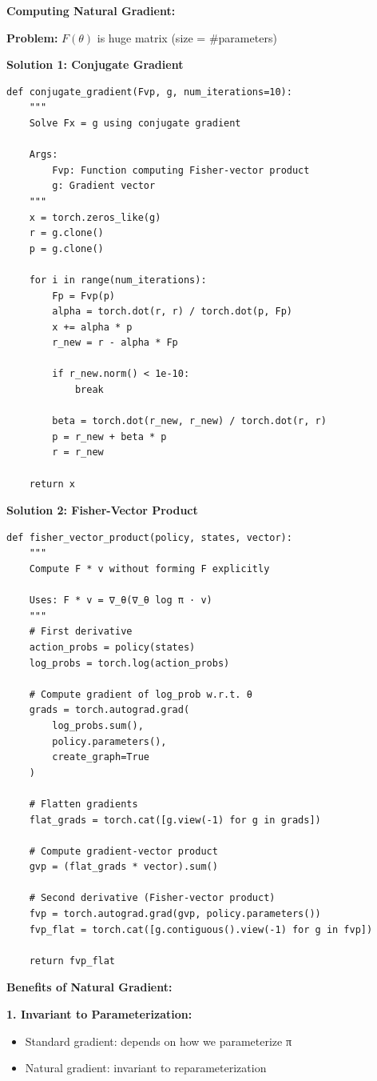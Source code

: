 \documentclass[12pt]{article}
\begin{document}
{{\textbf{Computing Natural Gradient:}

\textbf{Problem:} $F(\theta)$ is huge matrix (size = #parameters)

\textbf{Solution 1: Conjugate Gradient}

\begin{verbatim}
def conjugate_gradient(Fvp, g, num_iterations=10):
    """
    Solve Fx = g using conjugate gradient
    
    Args:
        Fvp: Function computing Fisher-vector product
        g: Gradient vector
    """
    x = torch.zeros_like(g)
    r = g.clone()
    p = g.clone()
    
    for i in range(num_iterations):
        Fp = Fvp(p)
        alpha = torch.dot(r, r) / torch.dot(p, Fp)
        x += alpha * p
        r_new = r - alpha * Fp
        
        if r_new.norm() < 1e-10:
            break
            
        beta = torch.dot(r_new, r_new) / torch.dot(r, r)
        p = r_new + beta * p
        r = r_new
    
    return x
\end{verbatim}

\textbf{Solution 2: Fisher-Vector Product}

\begin{verbatim}
def fisher_vector_product(policy, states, vector):
    """
    Compute F * v without forming F explicitly
    
    Uses: F * v = ∇_θ(∇_θ log π · v)
    """
    # First derivative
    action_probs = policy(states)
    log_probs = torch.log(action_probs)
    
    # Compute gradient of log_prob w.r.t. θ
    grads = torch.autograd.grad(
        log_probs.sum(),
        policy.parameters(),
        create_graph=True
    )
    
    # Flatten gradients
    flat_grads = torch.cat([g.view(-1) for g in grads])
    
    # Compute gradient-vector product
    gvp = (flat_grads * vector).sum()
    
    # Second derivative (Fisher-vector product)
    fvp = torch.autograd.grad(gvp, policy.parameters())
    fvp_flat = torch.cat([g.contiguous().view(-1) for g in fvp])
    
    return fvp_flat
\end{verbatim}

\textbf{Benefits of Natural Gradient:}

\textbf{1. Invariant to Parameterization:}
\begin{itemize}
\item Standard gradient: depends on how we parameterize π
\item Natural gradient: invariant to reparameterization
\end{itemize}

}}
\end{document}
